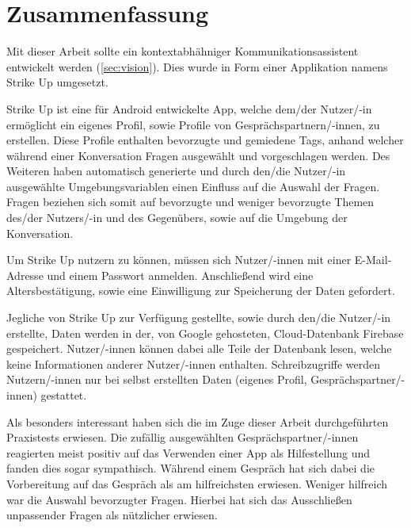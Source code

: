\chapter{Zusammenfassung}
\label{ch:zusammenfassung}

Mit dieser Arbeit sollte ein kontextabhähniger Kommunikationsassistent entwickelt werden (\ref{sec:vision}). Dies wurde in Form einer Applikation namens Strike Up umgesetzt.

Strike Up ist eine für Android entwickelte App, welche dem/der Nutzer/-in ermöglicht ein eigenes Profil, sowie Profile von Gesprächspartnern/-innen, zu erstellen. Diese Profile enthalten bevorzugte und gemiedene Tags, anhand welcher während einer Konversation Fragen ausgewählt und vorgeschlagen werden. Des Weiteren haben automatisch generierte und durch den/die Nutzer/-in ausgewählte Umgebungsvariablen einen Einfluss auf die Auswahl der Fragen. \newline
Fragen beziehen sich somit auf bevorzugte und weniger bevorzugte Themen des/der Nutzers/-in und des Gegenübers, sowie auf die Umgebung der Konversation.

Um Strike Up nutzern zu können, müssen sich Nutzer/-innen mit einer E-Mail-Adresse und einem Passwort anmelden. Anschließend wird eine Altersbestätigung, sowie eine Einwilligung zur Speicherung der Daten gefordert.

Jegliche von Strike Up zur Verfügung gestellte, sowie durch den/die Nutzer/-in erstellte, Daten werden in der, von Google gehosteten, Cloud-Datenbank Firebase gespeichert. Nutzer/-innen können dabei alle Teile der Datenbank lesen, welche keine Informationen anderer Nutzer/-innen enthalten. Schreibzugriffe werden Nutzern/-innen nur bei selbst erstellten Daten (eigenes Profil, Gesprächspartner/-innen) gestattet.

Als besonders interessant haben sich die im Zuge dieser Arbeit durchgeführten Praxistests erwiesen. \newline
Die zufällig ausgewählten Gesprächspartner/-innen reagierten meist positiv auf das Verwenden einer App als Hilfestellung und fanden dies sogar sympathisch. \newline
Während einem Gespräch hat sich dabei die Vorbereitung auf das Gespräch als am hilfreichsten erwiesen. Weniger hilfreich war die Auswahl bevorzugter Fragen. Hierbei hat sich das Ausschließen unpassender Fragen als nützlicher erwiesen.